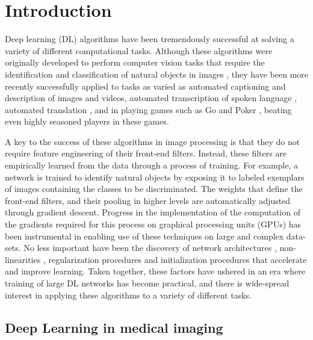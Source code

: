 \section{Introduction}\label{sec:intro}

Deep learning (DL) algorithms \citep{LeCun2015-js} have been tremendously
successful at solving a variety of different computational tasks. Although these
algorithms were originally developed to perform computer vision tasks that
require the identification and classification of natural objects in images
\citep{Krizhevsky2012-az}, they have been more recently successfully applied to
tasks as varied as automated captioning and description of images and
videos\citep{Karpathy2014-nx, Donahue2014-uq}, automated transcription of spoken
language \citep{Hannun2014-uj}, automated translation \citep{Wu2016-kx}, and in
playing games such as Go \citep{Silver2016-uv} and Poker \citep{Hsu2017-cr},
beating even highly seasoned players in these games.

A key to the success of these algorithms in image processing is that they do not
require feature engineering of their front-end filters. Instead, these filters
are empirically learned from the data through a process of training. For
example, a network is trained to identify natural objects by exposing it to
labeled exemplars of images containing the classes to be discriminated. The
weights that define the front-end filters, and their pooling in higher levels
are automatically adjusted through gradient descent. Progress in the
implementation of the computation of the gradients required for this process on
graphical processing units (GPUs) has been instrumental in enabling use of these
techniques on large and complex data-sets. No less important have been the
discovery of network architectures \citep{Canziani2016-ps}, non-linearities
\citep{Glorot2011-hk}, regularization procedures \citep{Hinton2012-fm} and
initialization procedures \citep{Glorot2010-is} that accelerate and improve
learning. Taken together, these factors have ushered in an era where training of
large DL networks has become practical, and there is wide-spread interest in
applying these algorithms to a variety of different tasks.

\subsection{Deep Learning in medical imaging}

